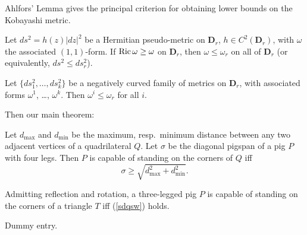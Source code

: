 Ahlfors' Lemma gives the principal criterion for obtaining lower bounds
on the Kobayashi metric.
\begin{Ahlfors}
Let $ds^2 = h(z)\lvert dz\rvert^2$ be a Hermitian pseudo-metric on
$\mathbf{D}_r$, $h\in C^2(\mathbf{D}_r)$, with $\omega$ the associated
$(1,1)$-form. If $\mathop{\mathrm{Ric}}\nolimits\omega\geq\omega$ on $\mathbf{D}_r$,
then $\omega\leq\omega_r$ on all of $\mathbf{D}_r$ (or equivalently,
$ds^2\leq ds_r^2$).
\end{Ahlfors}

\begin{lemsw}
Let $\{ds_1^2,\dots,ds_k^2\}$ be a negatively curved family of metrics
on $\mathbf{D}_r$, with associated forms $\omega^1$, \dots, $\omega^k$.
Then $\omega^i \leq\omega_r$ for all $i$.
\end{lemsw}

Then our main theorem:
\begin{thmsw}
Let $d_{\max}$ and $d_{\min}$ be the maximum, resp.\ minimum distance
between any two adjacent vertices of a quadrilateral $Q$. Let $\sigma$
be the diagonal pigspan of a pig $P$ with four legs.
Then $P$ is capable of standing on the corners of $Q$ iff
\begin{equation}\label{sdqsw}
\sigma\geq \sqrt{d_{\max}^2+d_{\min}^2}.
\end{equation}
\end{thmsw}

\begin{corsw}
Admitting reflection and rotation, a three-legged pig $P$ is capable of
standing on the corners of a triangle $T$ iff (\ref{sdqsw}) holds.
\end{corsw}

\begin{thebibliography}{99}
 Dummy entry.
\end{thebibliography}


